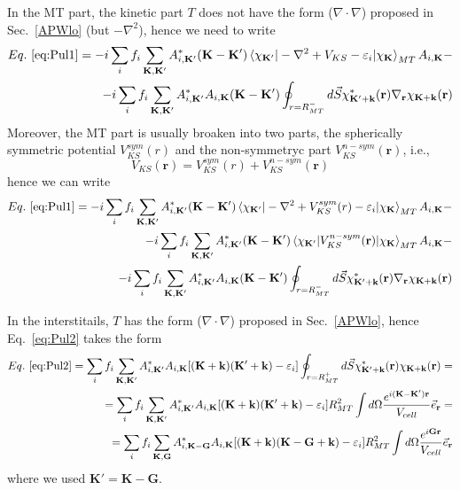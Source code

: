 \documentclass[aps,prb,floatfix,epsfig,singlecolumn,showpacs,preprintnumbers]{revtex4}
\renewcommand{\vr}{{\mathbf{r}}}
\newcommand{\vk}{{\mathbf{k}}}
\newcommand{\vK}{{\mathbf{K}}}
\newcommand{\vG}{{\mathbf{G}}}
\begin{document}
In the MT part, the kinetic part $T$ does not have the form ($\nabla\cdot\nabla$) proposed in
Sec.~\ref{APWlo} (but $-\nabla^2$), hence we need to write
\begin{eqnarray}
Eq.~\ref{eq:Pul1} = 
-i\sum_i f_i \sum_{\vK,\vK'} A_{i,\vK'}^* 
(\vK-\vK')\braket{ \chi_{\vK'}  |-\nabla^2+V_{KS}-\varepsilon_i|\chi_{\vK}}_{MT}A_{i,\vK}-
\label{eq:Pul1a}
\\
-i\sum_i f_i \sum_{\vK,\vK'} A_{i,\vK'}^* A_{i,\vK}
(\vK-\vK') \oint_{r=R_{MT}^-} d\vec{S} \chi_{\vK'+\vk}^*(\vr)  \nabla_\vr\chi_{\vK+\vk}(\vr)
\label{eq:Pul1b}
\end{eqnarray}
Moreover, the MT part is usually broaken into two parts, the
spherically symmetric potential $V_{KS}^{sym}(r)$ and the
non-symmetryc part $V_{KS}^{n-sym}(\vr)$, i.e., 
$$V_{KS}(\vr)=V_{KS}^{sym}(r)+V_{KS}^{n-sym}(\vr)$$
hence we can write
\begin{eqnarray}
Eq.~\ref{eq:Pul1} = 
-i\sum_i f_i \sum_{\vK,\vK'} A_{i,\vK'}^* 
(\vK-\vK')\braket{ \chi_{\vK'}  |-\nabla^2+V^{sym}_{KS}(r)-\varepsilon_i|\chi_{\vK}}_{MT}A_{i,\vK}-
\label{eq:Pul1a}\\
-i\sum_i f_i \sum_{\vK,\vK'} A_{i,\vK'}^* 
(\vK-\vK')\braket{ \chi_{\vK'}  |V_{KS}^{n-sym}(\vr)|\chi_{\vK}}_{MT}A_{i,\vK}-
\label{eq:Pul1b}
\\
-i\sum_i f_i \sum_{\vK,\vK'} A_{i,\vK'}^* A_{i,\vK}
(\vK-\vK') \oint_{r=R_{MT}^-} d\vec{S} \chi_{\vK'+\vk}^*(\vr)  \nabla_\vr\chi_{\vK+\vk}(\vr)
\label{eq:Pul1c}
\end{eqnarray}



In the interstitails, $T$ has the form ($\nabla\cdot\nabla$) proposed in Sec.~\ref{APWlo},
hence Eq.~\ref{eq:Pul2} takes the form
\begin{eqnarray}
Eq.~\ref{eq:Pul2}=
\sum_i f_i \sum_{\vK,\vK'} A_{i,\vK'}^*A_{i,\vK}   [(\vK+\vk)(\vK'+\vk)-\varepsilon_i] \oint_{r=R_{MT}^+}d\vec{S} \chi^*_{\vK'+\vk}(\vr)\chi_{\vK+\vk}(\vr) =\\
=\sum_i f_i \sum_{\vK,\vK'} A_{i,\vK'}^*A_{i,\vK}  [(\vK+\vk)(\vK'+\vk)-\varepsilon_i] R_{MT}^2 \int d\Omega \frac{e^{i(\vK-\vK')\vr}}{V_{cell}}\vec{e}_\vr=\\
=\sum_i f_i \sum_{\vK,\vG} A_{i,\vK-\vG}^*A_{i,\vK}  [(\vK+\vk)(\vK-\vG+\vk)-\varepsilon_i] R_{MT}^2 \int d\Omega \frac{e^{i\vG\vr}}{V_{cell}}\vec{e}_\vr
\label{eq:Pul2a}
 \end{eqnarray}
where we used $\vK'=\vK-\vG$.
\end{document}
